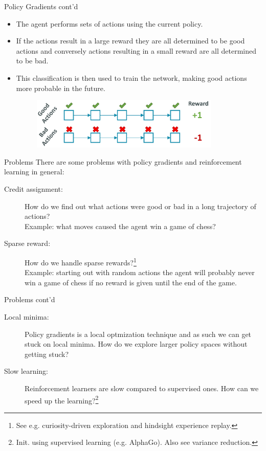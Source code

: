 \documentclass{beamer}
\begin{document}
\begin{frame}{Policy Gradients cont'd}
  \begin{itemize}
  \item The agent performs sets of actions using the current policy.
  \item If the actions result in a large reward they are all determined to be good actions and conversely actions resulting in a small reward are all determined to be bad.
  \item This classification is then used to train the network, making good actions more probable in the future.
  \begin{figure}
    \centering
    \includegraphics[width=0.85\textwidth]{trajectory_of_actions.png}
  \end{figure}
  \end{itemize}
\end{frame}

\begin{frame}{Problems}
  There are some problems with policy gradients and reinforcement learning in general:
  \begin{description}
  \item[Credit assignment:] How do we find out what actions were good or bad in a long trajectory of actions?\\
  Example: what moves caused the agent win a game of chess?
  \item[Sparse reward:] How do we handle sparse rewards?\footnote{See e.g. curiosity-driven exploration and hindsight experience replay.}\\
  Example: starting out with random actions the agent will probably never win a game of chess if no reward is given until the end of the game.
  \end{description}
\end{frame}

\begin{frame}{Problems cont'd}
  \begin{description}
  \item[Local minima:] Policy gradients is a local optmization technique and as such we can get stuck on local minima. How do we explore larger policy spaces without getting stuck?
  \item[Slow learning:] Reinforcement learners are slow compared to supervised ones. How can we speed up the learning?\footnote{Init. using supervised learning (e.g. AlphaGo). Also see variance reduction.}
  \end{description}
\end{frame}
\end{document}
